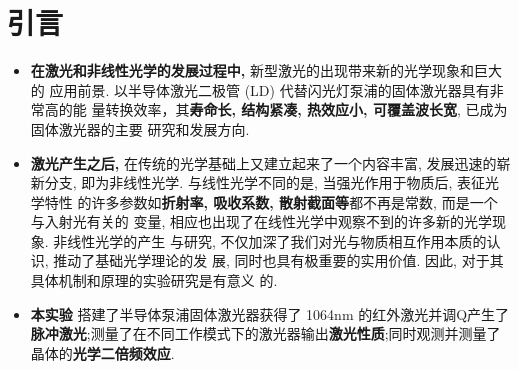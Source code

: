 \documentclass[a4paper]{article}
\begin{document}

\section{引言} \label{overview}%
 
\begin{itemize}
	\item{\textbf{在激光和非线性光学的发展过程中,} 新型激光的出现带来新的光学现象和巨大的
应用前景. 以半导体激光二极管 (LD) 代替闪光灯泵浦的固体激光器具有非常高的能
量转换效率，其{\bf{寿命长, 结构紧凑, 热效应小, 可覆盖波长宽}}, 已成为固体激光器的主要
研究和发展方向.}
    \item{\textbf{激光产生之后,} 在传统的光学基础上又建立起来了一个内容丰富, 发展迅速的崭
新分支, 即为非线性光学. 与线性光学不同的是, 当强光作用于物质后, 表征光学特性
的许多参数如{\bf{折射率, 吸收系数, 散射截面等}}都不再是常数, 而是一个与入射光有关的
变量, 相应也出现了在线性光学中观察不到的许多新的光学现象. 非线性光学的产生
与研究, 不仅加深了我们对光与物质相互作用本质的认识, 推动了基础光学理论的发
展, 同时也具有极重要的实用价值. 因此, 对于其具体机制和原理的实验研究是有意义
的.}
    \item{\textbf{本实验} 搭建了半导体泵浦固体激光器获得了 1064nm 的红外激光并调Q产生了{\bf{脉冲激光}};测量了在不同工作模式下的激光器输出{\bf{激光性质}};同时观测并测量了晶体的{\bf{光学二倍频效应}}.}
\end{itemize}

\newpage
\end{document}
